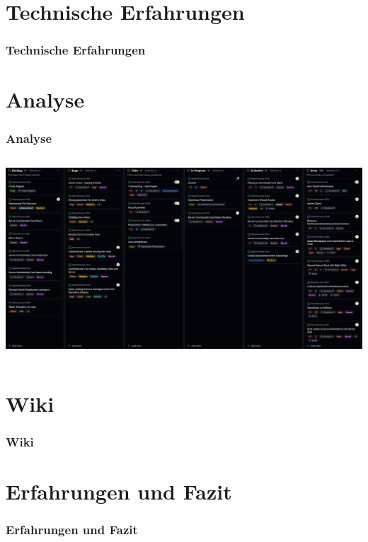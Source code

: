 \documentclass{beamer}
\begin{document}
\section{Technische Erfahrungen}
\begin{frame}
\frametitle{Technische Erfahrungen}
\end{frame}

\section{Analyse}
\begin{frame}
\frametitle{Analyse}
\begin{columns}
  \begin{column}{1\textwidth}
    \includegraphics{Kanban.png} %
  \end{column}
\end{columns}
\end{frame}

\section{Wiki}
\begin{frame}
\frametitle{Wiki}

\end{frame}

\section{Erfahrungen und Fazit}
\begin{frame}
\frametitle{Erfahrungen und Fazit}

\end{frame}
\end{document}
